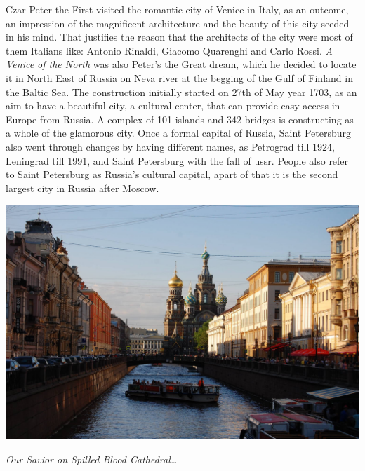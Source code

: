 \documentclass[10pt,a4paper]{article} %
\begin{document}
\begin{multicols}{3}
Czar Peter the First visited the romantic city of Venice in Italy, as an outcome, 
an impression of the magnificent architecture and the beauty of this city 
seeded in his mind. 
That justifies the reason that the architects of the city were most of them Italians 
like: Antonio Rinaldi, Giacomo Quarenghi and Carlo Rossi. 
\textit{A Venice of the North} was also Peter's the Great dream, 
which he decided to locate it in North East of Russia on Neva river 
at the begging of the Gulf of Finland in the Baltic Sea. 
The construction initially started on 27th of May year 1703, 
as an aim to have a beautiful city, a cultural center, 
that can provide easy access in Europe from Russia. 
A complex of 101 islands and 342 bridges is constructing as a whole of the glamorous city. 
Once a formal capital of Russia, Saint Petersburg also went through 
changes by having different names, as Petrograd till 1924, Leningrad till 1991, 
and Saint Petersburg with the fall of {\sc ussr}. 
People also refer to Saint Petersburg as Russia's cultural capital, 
apart of that it is the second largest city in Russia after Moscow.


\end{multicols} %

\begin{center}
\vspace{10pt}
\includegraphics[width=0.8\linewidth]{media/main_picture.jpg} %
\par\large\textit{Our Savior on Spilled Blood Cathedral\ldots}
\vspace{10pt}
\end{center}
\end{document}
